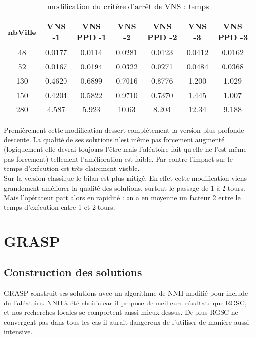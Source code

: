 \documentclass[12pt,a4paper]{article}
\begin{document}
\begin{table}[!h]
\centering
\begin{tabular}{|*{7}{c|}}
  \hline
  nbVille & VNS -1 & VNS PPD -1 & VNS -2 & VNS PPD -2 & VNS -3 & VNS PPD -3 \\
  \hline
  48 & 0.0177 & 0.0114 & 0.0281 & 0.0123 & 0.0412 & 0.0162 \\ 
  52 & 0.0167 & 0.0194 & 0.0322 & 0.0271 & 0.0484 & 0.0368 \\
  130 & 0.4620 & 0.6899 & 0.7016 & 0.8776 & 1.200 & 1.029 \\
  150 & 0.4204 & 0.5822 & 0.9710 & 0.7370 & 1.445 & 1.007 \\  
  280 & 4.587 & 5.923 & 10.63 & 8.204 & 12.34 & 9.188 \\
  \hline
\end{tabular}
\caption{modification du critère d’arrêt de VNS : temps}
\label{stopingRuleVNStemps}
\end{table}

Premièrement cette modification dessert complètement la version plus profonde descente. La qualité de ses solutions n'est même pas forcement augmenté (logiquement elle devrai toujours l’être mais l’aléatoire fait qu'elle ne l'est même pas forcement) tellement l’amélioration est faible. Par contre l'impact sur le temps d’exécution est très clairement visible.\\

Sur la version classique le bilan est plus mitigé. En effet cette modification viens grandement améliorer la qualité des solutions, surtout le passage de 1 à 2 tours. Mais l'opérateur part alors en rapidité : on a en moyenne un facteur 2 entre le temps d’exécution entre 1 et 2 tours.\\ 

\section{GRASP}

\subsection{Construction des solutions}

GRASP construit ses solutions avec un algorithme de NNH modifié pour include de l'aléatoire. NNH à été choisis car il propose de meilleurs résultats que RGSC, et nos recherches locales se comportent aussi mieux dessus. De plus RGSC ne convergent pas dans tous les cas il aurait dangereux de l'utiliser de manière aussi intensive.\\
\end{document}
